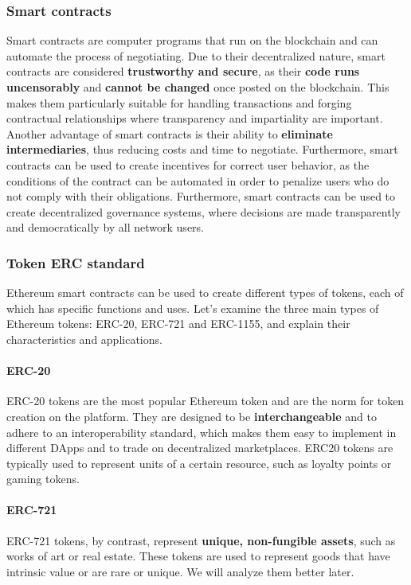 \subsubsection{Smart contracts}
Smart contracts are computer programs that run on the blockchain and can automate the process of negotiating. Due to their decentralized nature, smart contracts are considered \textbf{trustworthy and secure}, as their \textbf{code runs uncensorably} and \textbf{cannot be changed} once posted on the blockchain. This makes them particularly suitable for handling transactions and forging contractual relationships where transparency and impartiality are important.
\\
\indent Another advantage of smart contracts is their ability to \textbf{eliminate intermediaries}, thus reducing costs and time to negotiate. Furthermore, smart contracts can be used to create incentives for correct user behavior, as the conditions of the contract can be automated in order to penalize users who do not comply with their obligations. Furthermore, smart contracts can be used to create decentralized governance systems, where decisions are made transparently and democratically by all network users.

\subsubsection{Token ERC standard}
Ethereum smart contracts can be used to create different types of tokens, each of which has specific functions and uses. Let's examine the three main types of Ethereum tokens: ERC-20, ERC-721 and ERC-1155, and explain their characteristics and applications.

\paragraph{ERC-20}
ERC-20 tokens are the most popular Ethereum token and are the norm for token creation on the platform. They are designed to be \textbf{interchangeable} and to adhere to an interoperability standard, which makes them easy to implement in different DApps and to trade on decentralized marketplaces. ERC20 tokens are typically used to represent units of a certain resource, such as loyalty points or gaming tokens.

\paragraph{ERC-721}
ERC-721 tokens, by contrast, represent \textbf{unique, non-fungible assets}, such as works of art or real estate. These tokens are used to represent goods that have intrinsic value or are rare or unique. We will analyze them better later.

